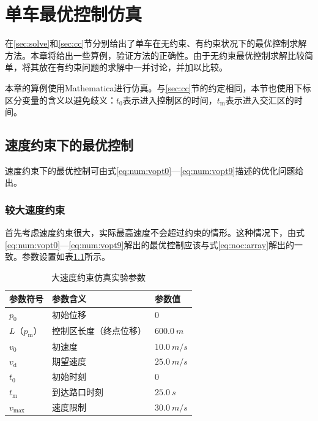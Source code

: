 \chapter{单车最优控制仿真}
\label{cha:exp}
在\ref{sec:solve}和\ref{sec:cc}节分别给出了单车在无约束、有约束状况下的最优控制求解方法。本章将给出一些算例，验证方法的正确性。由于无约束最优控制求解比较简单，将其放在有约束问题的求解中一并讨论，并加以比较。

本章的算例使用{\ttfamily Mathematica}进行仿真。与\ref{sec:cc}节的约定相同，本节也使用下标区分变量的含义以避免歧义：$t_0$表示进入控制区的时间，$t_\mathrm{m}$表示进入交汇区的时间。

\section{速度约束下的最优控制}
速度约束下的最优控制可由式\eqref{eq:num:vopt0}---\eqref{eq:num:vopt9}描述的优化问题给出。

\subsection{较大速度约束}
首先考虑速度约束很大，实际最高速度不会超过约束的情形。这种情况下，由式\eqref{eq:num:vopt0}---\eqref{eq:num:vopt9}解出的最优控制应该与式\eqref{eq:noc:array}解出的一致。参数设置如表\ref{tab:vbig:param}所示。
\begin{table}[htbp]
\centering
\caption{大速度约束仿真实验参数}
\label{tab:vbig:param}
\begin{tabular}{lll}
\toprule[1.5pt]
参数符号 & 参数含义 & 参数值 \\
\midrule[1pt]
$p_0$ & 初始位移 & $0$ \\
$L$（$p_\mathrm{m}$） & 控制区长度（终点位移） & $\SI{600.0}{m}$ \\
$v_0$ & 初速度 & $\SI{10.0}{m\per s}$ \\
$v_\mathrm{d}$ & 期望速度 & $\SI{25.0}{m\per s}$ \\
$t_0$ & 初始时刻 & $0$ \\
$t_\mathrm{m}$ & 到达路口时刻 & $\SI{25.0}{s}$ \\
$v_{\max}$ & 速度限制 & $\SI{30.0}{m\per s}$ \\
\bottomrule[1.5pt]
\end{tabular}
\end{table}

